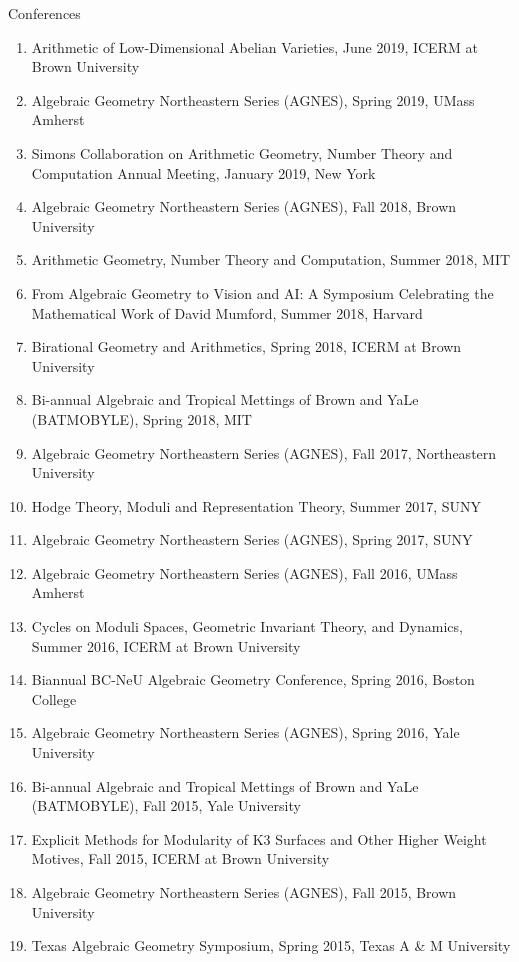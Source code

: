 \documentclass{resume} %
\begin{document}
\begin{rSection}{Conferences}
\begin{enumerate}
\item Arithmetic of Low-Dimensional Abelian Varieties, June 2019, ICERM at Brown University
\item Algebraic Geometry Northeastern Series (AGNES), Spring 2019, UMass Amherst
\item Simons Collaboration on Arithmetic Geometry, Number Theory and Computation Annual Meeting, January 2019, New York
\item Algebraic Geometry Northeastern Series (AGNES), Fall 2018, Brown University
\item Arithmetic Geometry, Number Theory and Computation, Summer 2018, MIT
\item From Algebraic Geometry to Vision and AI: A Symposium Celebrating the Mathematical Work of David Mumford, Summer 2018, Harvard
\item Birational Geometry and Arithmetics, Spring 2018, ICERM at Brown University
\item Bi-annual Algebraic and Tropical Mettings of Brown and YaLe (BATMOBYLE), Spring 2018, MIT
\item Algebraic Geometry Northeastern Series (AGNES), Fall 2017, Northeastern University
\item Hodge Theory, Moduli and Representation Theory, Summer 2017, SUNY
\item Algebraic Geometry Northeastern Series (AGNES), Spring 2017, SUNY
\item Algebraic Geometry Northeastern Series (AGNES), Fall 2016, UMass Amherst
\item Cycles on Moduli Spaces, Geometric Invariant Theory, and Dynamics, Summer 2016, ICERM at Brown University
\item Biannual BC-NeU Algebraic Geometry Conference, Spring 2016, Boston College
\item Algebraic Geometry Northeastern Series (AGNES), Spring 2016, Yale University
\item Bi-annual Algebraic and Tropical Mettings of Brown and YaLe (BATMOBYLE), Fall 2015, Yale University
\item Explicit Methods for Modularity of K3 Surfaces and Other Higher Weight Motives, Fall 2015, ICERM at Brown University
\item Algebraic Geometry Northeastern Series (AGNES), Fall 2015, Brown University
\item Texas Algebraic Geometry Symposium, Spring 2015, Texas A \& M University





\end{enumerate}



\end{rSection}
\end{document}

